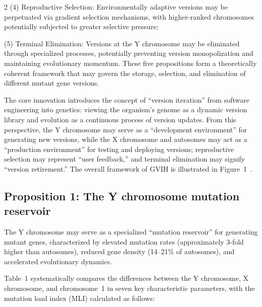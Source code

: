 \documentclass{base}
\begin{document}
\begin{multicols}{2}
(4) Reproductive Selection: Environmentally adaptive versions may be perpetuated via gradient selection mechanisms, with higher-ranked chromosomes potentially subjected to greater selective pressure; 

(5) Terminal Elimination: Versions at the Y chromosome may be eliminated through specialized processes, potentially preventing version monopolization and maintaining evolutionary momentum. These five propositions form a theoretically coherent framework that may govern the storage, selection, and elimination of different mutant gene versions.

The core innovation introduces the concept of ``version iteration'' from software engineering into genetics: viewing the organism's genome as a dynamic version library and evolution as a continuous process of version updates. From this perspective, the Y chromosome may serve as a ``development environment'' for generating new versions, while the X chromosome and autosomes may act as a ``production environment'' for testing and deploying versions; reproductive selection may represent ``user feedback,'' and terminal elimination may signify ``version retirement.'' The overall framework of GVIH is illustrated in Figure~1~\cite{jiang_generic_2025}.



\subsection{Proposition 1: The Y chromosome mutation reservoir}
The Y chromosome may serve as a specialized ``mutation reservoir'' for generating mutant genes, characterized by elevated mutation rates (approximately 3-fold higher than autosomes), reduced gene density (14--21\% of autosomes), and accelerated evolutionary dynamics. 

Table~1 systematically compares the differences between the Y chromosome, X chromosome, and chromosome~1 in seven key characteristic parameters, with the mutation load index (MLI) calculated as follows:


\end{multicols}
\end{document}
